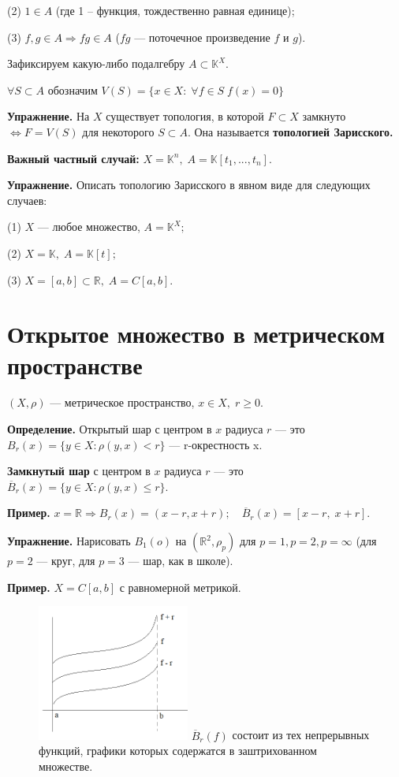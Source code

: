 \documentclass[12pt,a4paper]{article}
\begin{document}
(2) $1 \in A$ (где 1 -- функция, тождественно равная единице);
	
(3) $f, g \in A \Rightarrow fg \in A$ ($fg$ --- поточечное произведение $f$ и $g$).
	
Зафиксируем какую-либо подалгебру $A \subset \mathbb{K}^X.$
	
$\forall S \subset A$ обозначим $V(S) = \{ x \in X: \; \forall f \in S \; f(x) = 0 \}$ 
	
\textbf{Упражнение.} На $X$ существует топология, в которой $F \subset X$ замкнуто $\Leftrightarrow F = V(S)$ для некоторого $S \subset A$. Она называется \textbf{топологией Зарисского.}
	
\textbf{Важный частный случай:} $X = \mathbb{K}^n, \; A = \mathbb{K}[t_1, ..., t_n].$

\textbf{Упражнение.} Описать топологию Зарисского в явном виде для следующих случаев:
	
(1) $X$ --- любое множество, $A = \mathbb{K}^X;$
	
(2) $X = \mathbb{K}, \; A = \mathbb{K}[t];$
	
(3) $X = [a, b] \subset \mathbb{R}, \; A = C[a,b].$

\section{Открытое множество в метрическом пространстве}

$(X, \rho)$ --- метрическое пространство, $x \in X, \; r \geq 0$.

\textbf{Определение.} Открытый шар с центром в $x$ радиуса $r$ --- это 
$B_r(x) = \{ y \in X\!\!: \rho(y, x) < r\}$ --- r-окрестность x. 

\textbf{Замкнутый шар} с центром в $x$ радиуса $r$ --- это
$\overline{B}_r(x) = \{y \in X\!\!: \rho(y, x) \leq r\}.$

\textbf{Пример.} $x = \mathbb{R} \Rightarrow B_r(x) = (x - r, x + r); \quad \overline{B}_r(x) = [x - r, \; x + r].$

\textbf{Упражнение.} Нарисовать $B_1(o)$ на $(\mathbb{R}^2, \rho_p)$ для $p = 1, p = 2, p = \infty$ (для $p = 2$ --- круг, для $p = 3$ --- шар, как в школе).

\textbf{Пример.} $X = C[a,b]$ с равномерной метрикой.

\begin{figure}
	\includegraphics[width = 5cm]{lect2_1.png}
	$\overline{B}_r(f)$ состоит из тех непрерывных функций, графики которых содержатся в заштрихованном множестве.
\end{figure}
\end{document}
